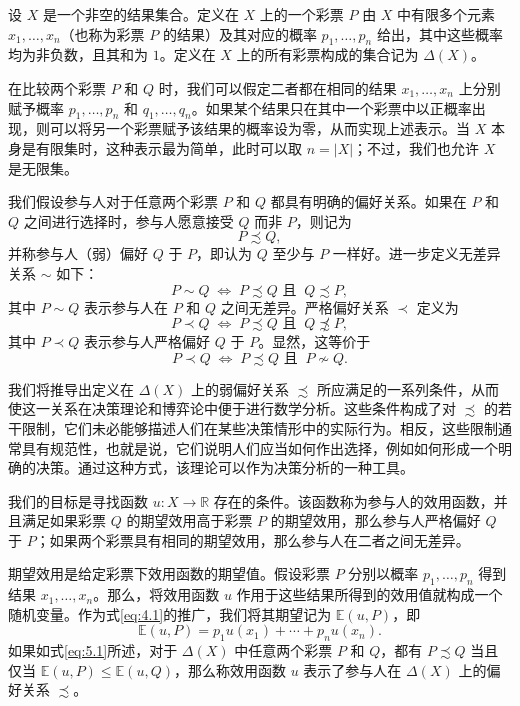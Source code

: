 \begin{definition}\label{def:5.1}
设 \(X\) 是一个非空的结果集合。定义在 \(X\) 上的一个彩票 \(P\) 由 \(X\) 中有限多个元素 \(x_1,\ldots,x_n\)（也称为彩票 \(P\) 的结果）及其对应的概率 \(p_1,\ldots,p_n\) 给出，其中这些概率均为非负数，且其和为 \(1\)。定义在 \(X\) 上的所有彩票构成的集合记为 \(\Delta(X)\)。
\end{definition}

在比较两个彩票 \(P\) 和 \(Q\) 时，我们可以假定二者都在相同的结果 \(x_1,\ldots,x_n\) 上分别赋予概率 \(p_1,\ldots,p_n\) 和 \(q_1,\ldots,q_n\)。如果某个结果只在其中一个彩票中以正概率出现，则可以将另一个彩票赋予该结果的概率设为零，从而实现上述表示。当 \(X\) 本身是有限集时，这种表示最为简单，此时可以取 \(n=|X|\)；不过，我们也允许 \(X\) 是无限集。

我们假设参与人对于任意两个彩票 \(P\) 和 \(Q\) 都具有明确的偏好关系。如果在 \(P\) 和 \(Q\) 之间进行选择时，参与人愿意接受 \(Q\) 而非 \(P\)，则记为
\[
P \precsim Q,
\]
并称参与人（弱）偏好 \(Q\) 于 \(P\)，即认为 \(Q\) 至少与 \(P\) 一样好。进一步定义无差异关系 \(\sim\) 如下：
\begin{equation}
\label{eq:5.4}
P \sim Q\; \Leftrightarrow \;P \precsim Q\text{ 且 }~Q \precsim P,
\end{equation}
其中 \(P \sim Q\) 表示参与人在 \(P\) 和 \(Q\) 之间无差异。严格偏好关系 \(\prec\) 定义为
\begin{equation}
\label{eq:5.5}
P \prec Q\; \Leftrightarrow \;P \precsim Q\text{ 且 }~Q \not\precsim P,
\end{equation}
其中 \(P \prec Q\) 表示参与人严格偏好 \(Q\) 于 \(P\)。显然，这等价于
\[
P \prec Q\; \Leftrightarrow \;P \precsim Q\text{ 且 }~P \not\sim Q.
\]

我们将推导出定义在 \(\Delta(X)\) 上的弱偏好关系 \(\precsim\) 所应满足的一系列条件，从而使这一关系在决策理论和博弈论中便于进行数学分析。这些条件构成了对 \(\precsim\) 的若干限制，它们未必能够描述人们在某些决策情形中的实际行为。相反，这些限制通常具有规范性，也就是说，它们说明人们应当如何作出选择，例如如何形成一个明确的决策。通过这种方式，该理论可以作为决策分析的一种工具。

我们的目标是寻找函数 \(u:X\to\mathbb{R}\) 存在的条件。该函数称为参与人的效用函数，并且满足如果彩票 \(Q\) 的期望效用高于彩票 \(P\) 的期望效用，那么参与人严格偏好 \(Q\) 于 \(P\)；如果两个彩票具有相同的期望效用，那么参与人在二者之间无差异。

期望效用是给定彩票下效用函数的期望值。假设彩票 \(P\) 分别以概率 \(p_1,\ldots,p_n\) 得到结果 \(x_1,\ldots,x_n\)。那么，将效用函数 \(u\) 作用于这些结果所得到的效用值就构成一个随机变量。作为式\eqref{eq:4.1}的推广，我们将其期望记为 \(\mathbb{E}(u,P)\)，即
\begin{equation}
\label{eq:5.6}
\mathbb{E}(u,P)=p_1u(x_1)+\cdots+p_nu(x_n).
\end{equation}
如果如式\eqref{eq:5.1}所述，对于 \(\Delta(X)\) 中任意两个彩票 \(P\) 和 \(Q\)，都有 \(P\precsim Q\) 当且仅当 \(\mathbb{E}(u,P)\leq \mathbb{E}(u,Q)\)，那么称效用函数 \(u\) 表示了参与人在 \(\Delta(X)\) 上的偏好关系 \(\precsim\)。

